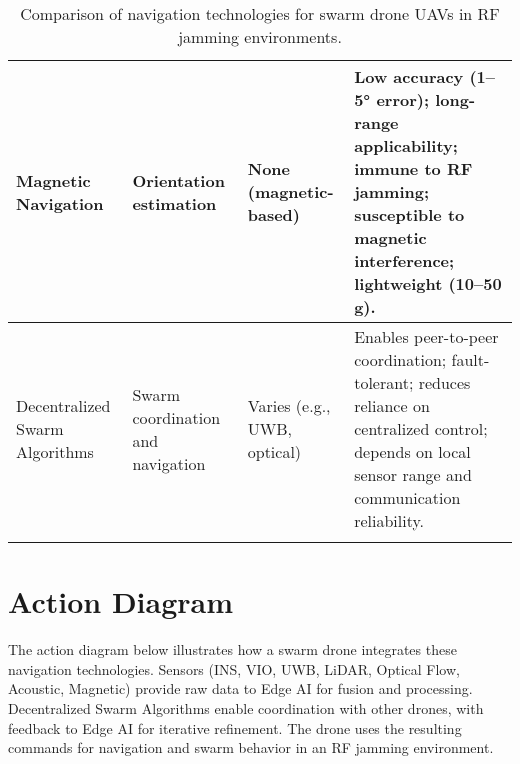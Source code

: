 \documentclass[12pt]{article}
\begin{document}
\begin{longtable}{|>{\raggedright\arraybackslash}p{3cm}|>{\raggedright\arraybackslash}p{3.5cm}|>{\raggedright\arraybackslash}p{3cm}|>{\raggedright\arraybackslash}p{6cm}|}
    \hline
    Magnetic Navigation & Orientation estimation & None (magnetic-based) & Low accuracy (1--5° error); long-range applicability; immune to RF jamming; susceptible to magnetic interference; lightweight (10--50 g). \\
    \hline
    Decentralized Swarm Algorithms & Swarm coordination and navigation & Varies (e.g., UWB, optical) & Enables peer-to-peer coordination; fault-tolerant; reduces reliance on centralized control; depends on local sensor range and communication reliability. \\
    \hline
    \caption{Comparison of navigation technologies for swarm drone UAVs in RF jamming environments.}
    \label{tab:nav_tech}
\end{longtable}

\section{Action Diagram}
The action diagram below illustrates how a swarm drone integrates these navigation technologies. Sensors (INS, VIO, UWB, LiDAR, Optical Flow, Acoustic, Magnetic) provide raw data to Edge AI for fusion and processing. Decentralized Swarm Algorithms enable coordination with other drones, with feedback to Edge AI for iterative refinement. The drone uses the resulting commands for navigation and swarm behavior in an RF jamming environment.
\end{document}
